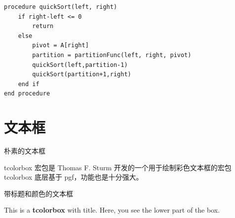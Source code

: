\documentclass{cls/simplereport}
\begin{document}
\begin{lstlisting}[caption={伪代码}, 
	emph={[1]procedure, if, return, else, end}, 
	emphstyle={[1]\color{blue}}, 
	emph={[2]quickSort}, 
	emphstyle={[2]\color{red}}]
procedure quickSort(left, right)
    if right-left <= 0
        return
    else     
        pivot = A[right]
        partition = partitionFunc(left, right, pivot)
        quickSort(left,partition-1)
        quickSort(partition+1,right)    
    end if		
end procedure
\end{lstlisting}

\section{文本框}

朴素的文本框
\begin{tcolorbox}[
	colback=white, 
	colframe=gray, 
	sharp corners, 
	leftrule={2pt}, rightrule={0.5pt}, toprule={0.5pt}, bottomrule={0.5pt}, 
	left={2pt}, right={2pt}, top={3pt}, bottom={3pt}
	]
	tcolorbox 宏包是 Thomas F. Sturm 开发的一个用于绘制彩色文本框的宏包 tcolorbox 底层基于 pgf，功能也是十分强大。
\end{tcolorbox}

\noindent 带标题和颜色的文本框

\begin{tcolorbox}[
	colback=white, 
	colframe=blue!15, 
	sharp corners, 
	coltitle=black, 
	left={2pt}, right={2pt}, top={3pt}, bottom={3pt}, 
	title = {注意事项}]
	This is a \textbf{tcolorbox} with title.
	\tcblower
	Here, you see the lower part of the box.
\end{tcolorbox}
	
\end{document}
